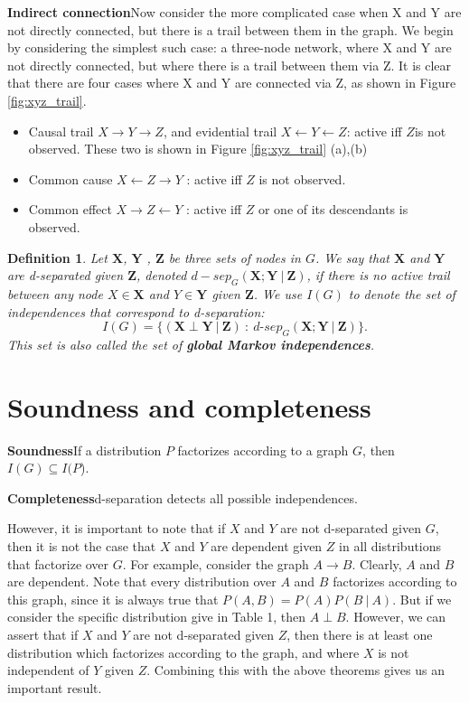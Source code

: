 \documentclass[twoside]{article}
\newtheorem{Defn}{Definition}[section]
\begin{document}
\textbf{Indirect connection}\quad Now consider the more complicated case when X and Y are not directly connected, but there is a trail between them in the graph. We begin by considering the simplest such case: a three-node network, where X and Y are not directly connected, but where there is a trail between them via Z. It is clear that there are four cases where X and Y are connected via Z, as shown in Figure \ref{fig:xyz_trail}.

\begin{itemize}
\item Causal trail \(X \rightarrow Y \rightarrow Z\), and evidential trail \(X \leftarrow Y \leftarrow Z\): active iff \(Z\)is not observed. These two is shown in Figure \ref{fig:xyz_trail} (a),(b)
\item Common cause \(X \leftarrow Z \rightarrow Y\) : active iff \(Z\) is not observed.
\item Common effect \(X \rightarrow Z \leftarrow Y\) : active iff \(Z\) or one of its descendants is observed.
\end{itemize}

\begin{Defn}
Let \(\mathbf{X}\), \(\mathbf{Y}\) , \(\mathbf{Z}\) be three sets of nodes in \(G\). We say that \(\mathbf{X}\) and \(\mathbf{Y}\) are d\textrm{-}separated given \(\mathbf{Z}\), denoted \(d-sep_G(\mathbf{X} ; \mathbf{Y} \ |\ \mathbf{Z})\), if there is no active trail between any node \(X \in \mathbf{X}\) and \(Y \in \mathbf{Y}\) given \(\mathbf{Z}\). We use \(I(G)\) to denote the set of independences that correspond to d-separation:
\[I(G) = \{(\mathbf{X}\perp{\mathbf{Y}}\ |\ \mathbf{Z})\ :\ d\textrm{-}sep_G(\mathbf{X} ; \mathbf{Y} \ |\ \mathbf{Z})\}.\]
This set is also called the set of \textbf{global Markov independences}.
\end{Defn}

\section{Soundness and completeness}

\textbf{Soundness}\quad If a distribution \(P\) factorizes according to a graph \(G\), then \(I(G) \subseteq I(P\)).

\textbf{Completeness}\quad d-separation detects all possible independences.

However, it is important to note that if \(X\) and \(Y\) are not d-separated given \(G\), then it is not the case that \(X\) and \(Y\) are dependent given \(Z\) in all distributions that factorize over \(G\). For example, consider the graph \(A \rightarrow B\). Clearly, \(A\) and \(B\) are dependent. Note that every distribution over \(A\) and \(B\) factorizes according to this graph, since it is always true that \(P(A, B) = P(A)P(B\ |\ A)\). But if we consider the specific distribution give in Table 1, then \(A \perp B\). However, we can assert that if \(X\) and \(Y\) are not d-separated given \(Z\), then there is at least one distribution which factorizes according to the graph, and where \(X\) is not independent of \(Y\) given \(Z\). Combining this with the above theorems gives us an important result.
\end{document}
